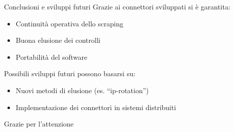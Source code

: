 \begin{frame}{Conclusioni e sviluppi futuri}
    Grazie ai connettori sviluppati si \`e garantita:
    \begin{itemize}
        \item Continuit\`a operativa dello scraping
        \item Buona elusione dei controlli
        \item Portabilit\`a del software
    \end{itemize}
    Possibili \alert{sviluppi futuri} possono basarsi su:
    \begin{itemize}
        \item Nuovi metodi di elusione (es. ``ip-rotation'') 
        \item Implementazione dei connettori in sistemi distribuiti
    \end{itemize}
\end{frame}
\begin{frame}
     \centering
     \huge{Grazie per l'attenzione}
\end{frame}